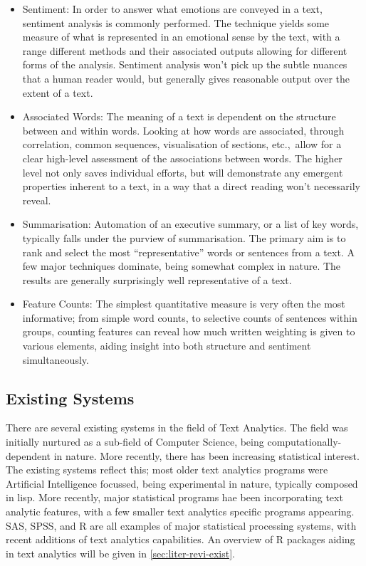 \documentclass[11pt, a4paper, oneside]{report}
\begin{document}
\begin{itemize}
\item Sentiment: In order to answer what emotions are conveyed in a
  text, sentiment analysis is commonly performed. The technique yields
  some measure of what is represented in an emotional sense by the
  text, with a range different methods and their associated outputs
  allowing for different forms of the analysis. Sentiment analysis
  won't pick up the subtle nuances that a human reader would, but
  generally gives reasonable output over the extent of a text.
\item Associated Words: The meaning of a text is dependent on the
  structure between and within words. Looking at how words are
  associated, through correlation, common sequences, visualisation of
  sections, etc.,\ allow for a clear high-level assessment of the
  associations between words. The higher level not only saves
  individual efforts, but will demonstrate any emergent properties
  inherent to a text, in a way that a direct reading won't necessarily
  reveal.
\item Summarisation: Automation of an executive summary, or a list of
  key words, typically falls under the purview of summarisation. The
  primary aim is to rank and select the most ``representative'' words
  or sentences from a text. A few major techniques dominate, being
  somewhat complex in nature. The results are generally surprisingly
  well representative of a text.
\item Feature Counts: The simplest quantitative measure is very often
  the most informative; from simple word counts, to selective counts
  of sentences within groups, counting features can reveal how much
  written weighting is given to various elements, aiding insight into
  both structure and sentiment simultaneously.
\end{itemize}

\subsection{Existing Systems}
There are several existing systems in the field of Text Analytics. The
field was initially nurtured as a sub-field of Computer Science, being
computationally-dependent in nature. More recently, there has been
increasing statistical interest. The existing systems reflect this;
most older text analytics programs were Artificial Intelligence
focussed, being experimental in nature, typically composed in lisp.
More recently, major statistical programs hae been incorporating text
analytic features, with a few smaller text analytics specific programs
appearing. SAS, SPSS, and R are all examples of major statistical
processing systems, with recent additions of text analytics
capabilities. An overview of R packages aiding in text analytics will
be given in \autoref{sec:liter-revi-exist}.
\end{document}
